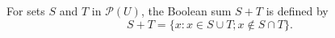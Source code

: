 For sets $S$ and $T$ in $\mathcal{P}(U)$, the Boolean sum $S + T$ is defined by
$$S + T = \{x : x \in S \cup T; x \notin S \cap T\}.$$
